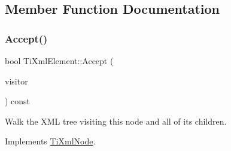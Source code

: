 \subsection{Member Function Documentation}
\mbox{\label{class_ti_xml_element_a01d33358cce9d1817b557d314dda3779}} 
\subsubsection{\texorpdfstring{Accept()}{Accept()}}
{\footnotesize\ttfamily bool Ti\+Xml\+Element\+::\+Accept (\begin{DoxyParamCaption}\item[{\hyperlink{class_ti_xml_visitor}{Ti\+Xml\+Visitor} $\ast$}]{visitor }\end{DoxyParamCaption}) const\hspace{0.3cm}{\ttfamily [virtual]}}

Walk the X\+ML tree visiting this node and all of its children. 

Implements \hyperlink{class_ti_xml_node_acc0f88b7462c6cb73809d410a4f5bb86}{Ti\+Xml\+Node}.

